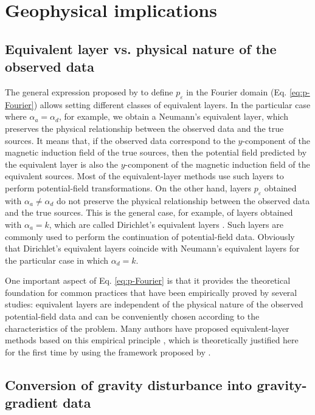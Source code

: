 \section{Geophysical implications}

\subsection{Equivalent layer vs. physical nature of the observed data}

The general expression proposed by \cite{oliveirajr_etal2026_1} to define $p_{\varepsilon}$ in 
the Fourier domain (Eq. \ref{eq:p-Fourier}) allows setting different classes of 
equivalent layers.
In the particular case where $\alpha_{a} = \alpha_{d}$, for example, we obtain a Neumann's 
equivalent layer, which preserves the physical relationship between the observed data and the 
true sources. It means that, if the observed data correspond to the $y$-component of the 
magnetic induction field of the true sources, 
then the potential field predicted by the equivalent layer is also the $y$-component of the 
magnetic induction field of the equivalent sources. Most of the equivalent-layer methods use 
such layers to perform potential-field transformations.
On the other hand, layers $p_{\varepsilon}$ obtained with $\alpha_{a} \ne \alpha_{d}$ do not
preserve the physical relationship between the observed data and the true sources. 
This is the general case, for example, of layers obtained with $\alpha_{a} = k$, which are 
called Dirichlet's equivalent layers \citep{oliveirajr_etal2026_1}. Such layers are commonly used 
to perform the continuation of potential-field data. Obviously that Dirichlet's equivalent 
layers coincide with Neumann's equivalent layers for the particular case in which 
$\alpha_{d} = k$. 

One important aspect of Eq. \ref{eq:p-Fourier} is that it provides the theoretical 
foundation for common practices that have been empirically proved by several studies: 
equivalent layers are independent of the physical nature of the observed potential-field data 
and can be conveniently chosen according to the characteristics of the problem. Many authors 
have proposed equivalent-layer methods based on this empirical principle
\citep[e.g.,][]{cordell1992, guspi_novara2009, li_etal2014, soler_uieda2021}, which is 
theoretically justified here for the first time by using the framework proposed by
\cite{oliveirajr_etal2026_1}.

\subsection{Conversion of gravity disturbance into gravity-gradient data}

